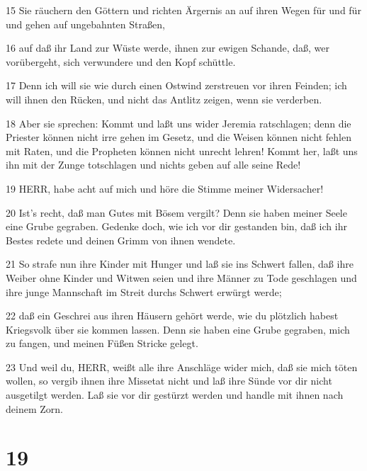 \par 15 Sie räuchern den Göttern und richten Ärgernis an auf ihren Wegen für und für und gehen auf ungebahnten Straßen,
\par 16 auf daß ihr Land zur Wüste werde, ihnen zur ewigen Schande, daß, wer vorübergeht, sich verwundere und den Kopf schüttle.
\par 17 Denn ich will sie wie durch einen Ostwind zerstreuen vor ihren Feinden; ich will ihnen den Rücken, und nicht das Antlitz zeigen, wenn sie verderben.
\par 18 Aber sie sprechen: Kommt und laßt uns wider Jeremia ratschlagen; denn die Priester können nicht irre gehen im Gesetz, und die Weisen können nicht fehlen mit Raten, und die Propheten können nicht unrecht lehren! Kommt her, laßt uns ihn mit der Zunge totschlagen und nichts geben auf alle seine Rede!
\par 19 HERR, habe acht auf mich und höre die Stimme meiner Widersacher!
\par 20 Ist's recht, daß man Gutes mit Bösem vergilt? Denn sie haben meiner Seele eine Grube gegraben. Gedenke doch, wie ich vor dir gestanden bin, daß ich ihr Bestes redete und deinen Grimm von ihnen wendete.
\par 21 So strafe nun ihre Kinder mit Hunger und laß sie ins Schwert fallen, daß ihre Weiber ohne Kinder und Witwen seien und ihre Männer zu Tode geschlagen und ihre junge Mannschaft im Streit durchs Schwert erwürgt werde;
\par 22 daß ein Geschrei aus ihren Häusern gehört werde, wie du plötzlich habest Kriegsvolk über sie kommen lassen. Denn sie haben eine Grube gegraben, mich zu fangen, und meinen Füßen Stricke gelegt.
\par 23 Und weil du, HERR, weißt alle ihre Anschläge wider mich, daß sie mich töten wollen, so vergib ihnen ihre Missetat nicht und laß ihre Sünde vor dir nicht ausgetilgt werden. Laß sie vor dir gestürzt werden und handle mit ihnen nach deinem Zorn.

\chapter{19}

